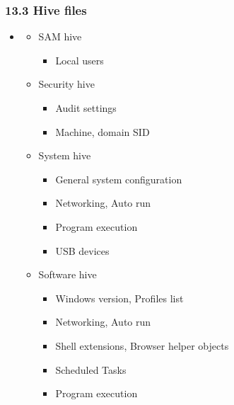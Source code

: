\begin{frame}[fragile]
  \frametitle{13.3 Hive files}
   \begin{itemize}
       \item[]
   \begin{itemize}
      \item SAM hive
      \begin{itemize}
          \item Local users
      \end{itemize}
      \item Security hive
      \begin{itemize}
          \item Audit settings
          \item Machine, domain SID
      \end{itemize}
      \item System hive
      \begin{itemize}
          \item General system configuration
          \item Networking, Auto run
          \item Program execution
          \item USB devices
       \end{itemize}
      \item Software hive
      \begin{itemize}
          \item Windows version, Profiles list
          \item Networking, Auto run
          \item Shell extensions, Browser helper objects
          \item Scheduled Tasks
          \item Program execution
      \end{itemize}
   \end{itemize}
   \end{itemize}
\end{frame}


